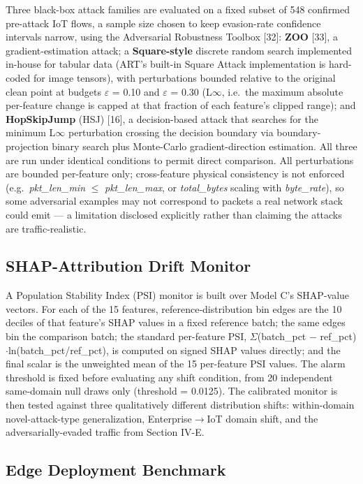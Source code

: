 \documentclass[conference]{IEEEtran}
\begin{document}
Three black-box attack families are evaluated on a fixed subset of 548 confirmed pre-attack IoT flows, a sample size chosen to keep evasion-rate confidence intervals narrow, using the Adversarial Robustness Toolbox [32]: \textbf{ZOO} [33], a gradient-estimation attack; a \textbf{Square-style} discrete random search implemented in-house for tabular data (ART's built-in Square Attack implementation is hard-coded for image tensors), with perturbations bounded relative to the original clean point at budgets $\varepsilon$ = 0.10 and $\varepsilon$ = 0.30 (L$\infty$, i.e.~the maximum absolute per-feature change is capped at that fraction of each feature's clipped range); and \textbf{HopSkipJump} (HSJ) [16], a decision-based attack that searches for the minimum L$\infty$ perturbation crossing the decision boundary via boundary-projection binary search plus Monte-Carlo gradient-direction estimation. All three are run under identical conditions to permit direct comparison. All perturbations are bounded per-feature only; cross-feature physical consistency is not enforced (e.g.~\textit{pkt\_len\_min} $\leq$ \textit{pkt\_len\_max}, or \textit{total\_bytes} scaling with \textit{byte\_rate}), so some adversarial examples may not correspond to packets a real network stack could emit --- a limitation disclosed explicitly rather than claiming the attacks are traffic-realistic.

\subsection{SHAP-Attribution Drift Monitor}

A Population Stability Index (PSI) monitor is built over Model C's SHAP-value vectors. For each of the 15 features, reference-distribution bin edges are the 10 deciles of that feature's SHAP values in a fixed reference batch; the same edges bin the comparison batch; the standard per-feature PSI, $\Sigma$(batch\_pct $-$ ref\_pct)$\cdot$ln(batch\_pct/ref\_pct), is computed on signed SHAP values directly; and the final scalar is the unweighted mean of the 15 per-feature PSI values. The alarm threshold is fixed before evaluating any shift condition, from 20 independent same-domain null draws only (threshold = 0.0125). The calibrated monitor is then tested against three qualitatively different distribution shifts: within-domain novel-attack-type generalization, Enterprise$\rightarrow$IoT domain shift, and the adversarially-evaded traffic from Section IV-E.

\subsection{Edge Deployment Benchmark}
\end{document}
